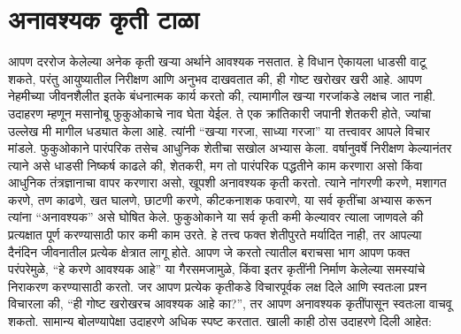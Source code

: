\chapter{अनावश्यक कृती टाळा}
आपण दररोज केलेल्या अनेक कृती खऱ्या अर्थाने आवश्यक नसतात. हे विधान ऐकायला धाडसी वाटू शकते, परंतु आयुष्यातील निरीक्षण आणि अनुभव दाखवतात की, ही गोष्ट खरोखर खरी आहे. आपण नेहमीच्या जीवनशैलीत इतके बंधनात्मक कार्य करतो की, त्यामागील खर्‍या गरजांकडे लक्षच जात नाही.
उदाहरण म्हणून मसानोबू फुकुओकाचे नाव घेता येईल. ते एक क्रांतिकारी जपानी शेतकरी होते, ज्यांचा उल्लेख मी मागील धड्यात केला आहे. त्यांनी “खऱ्या गरजा, साध्या गरजा” या तत्त्वावर आपले विचार मांडले. फुकुओकाने पारंपरिक तसेच आधुनिक शेतीचा सखोल अभ्यास केला. वर्षानुवर्षे निरीक्षण केल्यानंतर त्याने असे धाडसी निष्कर्ष काढले की, शेतकरी, मग तो पारंपरिक पद्धतीने काम करणारा असो किंवा आधुनिक तंत्रज्ञानाचा वापर करणारा असो, खूपशी अनावश्यक कृती करतो.
त्याने नांगरणी करणे, मशागत करणे, तण काढणे, खत घालणे, छाटणी करणे, कीटकनाशक फवारणे, या सर्व कृतींचा अभ्यास करून त्यांना “अनावश्यक” असे घोषित केले. फुकुओकाने या सर्व कृती कमी केल्यावर त्याला जाणवले की प्रत्यक्षात पूर्ण करण्यासाठी फार कमी काम उरते. हे तत्त्व फक्त शेतीपुरते मर्यादित नाही, तर आपल्या दैनंदिन जीवनातील प्रत्येक क्षेत्रात लागू होते.
आपण जे करतो त्यातील बराचसा भाग आपण फक्त परंपरेमुळे, “हे करणे आवश्यक आहे” या गैरसमजामुळे, किंवा इतर कृतींनी निर्माण केलेल्या समस्यांचे निराकरण करण्यासाठी करतो. जर आपण प्रत्येक कृतीकडे विचारपूर्वक लक्ष दिले आणि स्वतःला प्रश्न विचारला की, “ही गोष्ट खरोखरच आवश्यक आहे का?”, तर आपण अनावश्यक कृतींपासून स्वतःला वाचवू शकतो.
सामान्य बोलण्यापेक्षा उदाहरणे अधिक स्पष्ट करतात. खाली काही ठोस उदाहरणे दिली आहेत:
